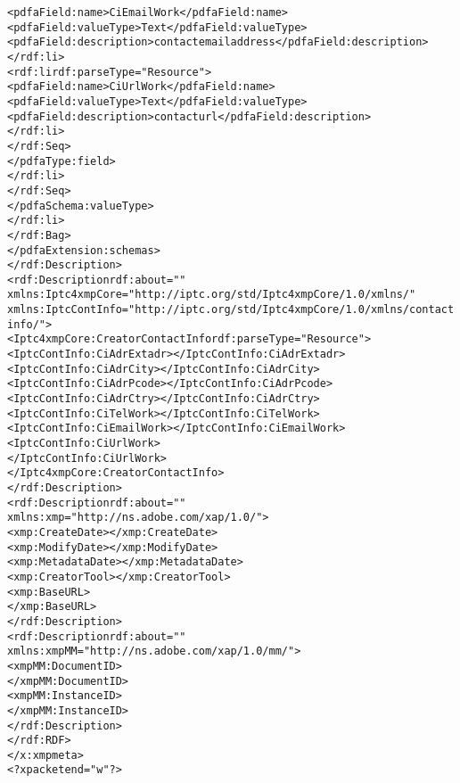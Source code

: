 \begin{alltt}
                              <pdfaField:name>CiEmailWork</pdfaField:name>
                              <pdfaField:valueType>Text</pdfaField:valueType>
                              <pdfaField:description>contact email address</pdfaField:description>
                            </rdf:li>
                            <rdf:li rdf:parseType="Resource">
                              <pdfaField:name>CiUrlWork</pdfaField:name>
                              <pdfaField:valueType>Text</pdfaField:valueType>
                              <pdfaField:description>contact url</pdfaField:description>
                            </rdf:li>
                          </rdf:Seq>
                        </pdfaType:field>
                      </rdf:li>
                    </rdf:Seq>
                  </pdfaSchema:valueType>
                </rdf:li>
              </rdf:Bag>
            </pdfaExtension:schemas>
          </rdf:Description>
          <rdf:Description rdf:about=""
               xmlns:Iptc4xmpCore="http://iptc.org/std/Iptc4xmpCore/1.0/xmlns/"
               xmlns:IptcContInfo="http://iptc.org/std/Iptc4xmpCore/1.0/xmlns/contactinfo/">
           <Iptc4xmpCore:CreatorContactInfo rdf:parseType="Resource">
             <IptcContInfo:CiAdrExtadr></IptcContInfo:CiAdrExtadr>
             <IptcContInfo:CiAdrCity></IptcContInfo:CiAdrCity>
             <IptcContInfo:CiAdrPcode></IptcContInfo:CiAdrPcode>
             <IptcContInfo:CiAdrCtry></IptcContInfo:CiAdrCtry>
             <IptcContInfo:CiTelWork></IptcContInfo:CiTelWork>
             <IptcContInfo:CiEmailWork></IptcContInfo:CiEmailWork>
             <IptcContInfo:CiUrlWork>
             </IptcContInfo:CiUrlWork>
           </Iptc4xmpCore:CreatorContactInfo>
          </rdf:Description>
          <rdf:Description rdf:about=""
                xmlns:xmp="http://ns.adobe.com/xap/1.0/">
             <xmp:CreateDate>\metavalue{\todayISO}</xmp:CreateDate>
             <xmp:ModifyDate>\metavalue{\todayISO}</xmp:ModifyDate>
             <xmp:MetadataDate>\metavalue{\todayISO}</xmp:MetadataDate>
             <xmp:CreatorTool></xmp:CreatorTool>
             <xmp:BaseURL>
             </xmp:BaseURL>
          </rdf:Description>
          <rdf:Description rdf:about=""
                xmlns:xmpMM="http://ns.adobe.com/xap/1.0/mm/">
             <xmpMM:DocumentID>
             </xmpMM:DocumentID>
             <xmpMM:InstanceID>
             </xmpMM:InstanceID>
          </rdf:Description>
       </rdf:RDF>
    </x:xmpmeta>
    <?xpacket end="w"?>
\end{alltt}
